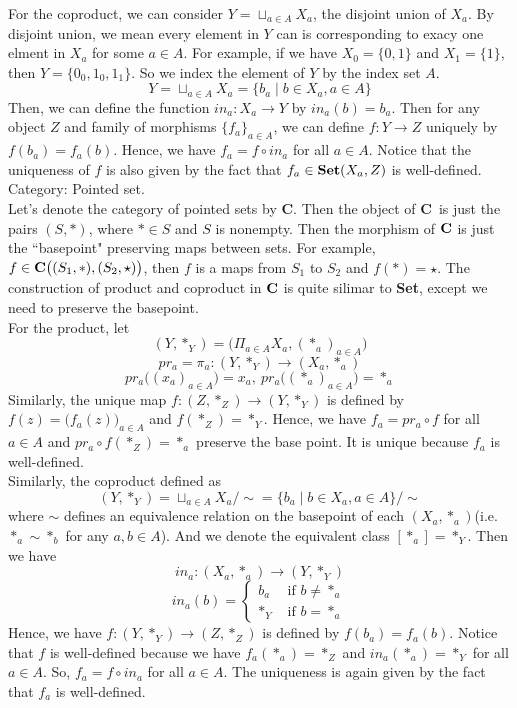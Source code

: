 \documentclass[12pt]{amsart}
\newcommand{\catname}[1]{{\normalfont\textbf{#1}}}
\newcommand{\Set}{\catname{Set}}
\newcommand{\Cat}{\catname{C}}
\begin{document}
For the coproduct, we can consider $Y=\sqcup_{a\in A}X_a$, the disjoint union of $X_a$. By disjoint union, we mean every element in $Y$ can is corresponding to exacy one elment in $X_a$ for some $a\in A$. For example, if we have $X_0=\{0,1\}$ and $X_1=\{1\}$, then $Y=\{0_0,1_0,1_1\}$. So we index the element of $Y$ by the index set $A$.
\[Y=\sqcup_{a\in A}X_a=\{b_a\mid b\in X_a,a\in A\}\] 
Then, we can define the function $in_a:X_a\to Y$ by $in_a(b)=b_a$. Then for any object $Z$ and family of morphisms $\{f_a\}_{a\in A}$, we can define $f:Y\to Z$ uniquely by $f(b_a)=f_a(b)$. Hence, we have $f_a=f\circ in_a$ for all $a\in A$. Notice that the uniqueness of $f$ is also given by the fact that $f_a\in \Set(X_a,Z)$ is well-defined.
\\\break
Category: Pointed set. \\
Let's denote the category of pointed sets by \Cat. Then the object of \Cat\  is just the pairs $(S,\ast)$, where $\ast\in S$ and $S$ is nonempty. Then the morphism of $\Cat$ is just the ``basepoint" preserving maps between sets.
For example, $f\in\Cat\big((S_1,\ast),(S_2,\star)\big)$, then $f$ is a maps from $S_1$ to $S_2$ and $f(\ast)=\star$. The construction of product and coproduct in $\Cat$ is quite silimar to \Set, except we need to preserve the basepoint.\\
For the product, let 
$$(Y,\ast_Y)=\big(\Pi_{a\in A}X_a,(\ast_a)_{a\in A}\big)$$
\[pr_a=\pi_a:(Y,\ast_Y)\to (X_a,\ast_a)\]
\[pr_a\big((x_a)_{a\in A}\big)=x_a,\ pr_a\big((\ast_a)_{a\in A}\big)=\ast_a \]
Similarly, the unique map $f:(Z,\ast_Z)\to (Y,\ast_Y)$ is defined by $f(z)=\big(f_a(z)\big)_{a\in A}$ and $f(\ast_Z)=\ast_Y$. Hence, we have $f_a=pr_a\circ f$ for all $a\in A$ and $pr_a\circ f(\ast_Z)=\ast_a$ preserve the base point. It is unique because $f_a$ is well-defined.\\
Similarly, the coproduct defined as 
\[(Y,\ast_Y)=\sqcup_{a\in A}X_a/\sim=\{b_a\mid b\in X_a,a\in A\}/\sim\]
where $\sim$ defines an equivalence relation on the basepoint of each $(X_a,\ast_a)$(i.e. $\ast_a\sim \ast_b$ for any $a,b\in A$). And we denote the equivalent class $[\ast_a]=\ast_Y$. Then we have 
\[in_a:(X_a,\ast_a)\to (Y,\ast_Y)\]
\[in_a(b)=\begin{cases}
    b_a &\text{ if } b\neq \ast_a\\
    \ast_Y &\text{ if } b= \ast_a
\end{cases}\]
Hence, we have $f:(Y,\ast_Y)\to (Z,\ast_Z)$ is defined by $f(b_a)=f_a(b)$. Notice that $f$ is well-defined because we have $f_a(\ast_a)=\ast_Z$ and $in_a(\ast_a)=\ast_Y$ for all $a\in A$. So, $f_a=f\circ in_a$ for all $a\in A$. The uniqueness is again given by the fact that $f_a$ is well-defined.\\
\end{document}
